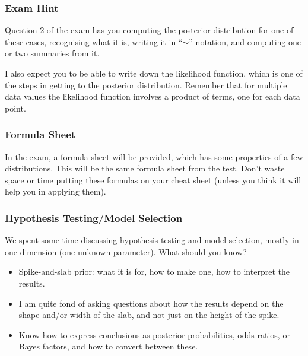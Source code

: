 \documentclass{beamer}
\begin{document}
\begin{frame}
\frametitle{Exam Hint}
Question 2 of the exam has you computing the posterior distribution for one
of these cases, recognising what it is, writing it in ``$\sim$'' notation,
and computing one or two summaries from it.\\[0.5em]\pause

I also expect you to be able to write down the likelihood function, which
is one of the steps in getting to the posterior distribution. Remember that
for multiple data values the likelihood function involves a product of terms,
one for each data point.

\end{frame}


\begin{frame}
\frametitle{Formula Sheet}
In the exam, a formula sheet will be provided, which has some properties of
a few distributions. This will be the same formula sheet from the test.
Don't waste space or time putting these formulas on your cheat sheet (unless
you think it will help you in applying them).

\end{frame}


\begin{frame}
\frametitle{Hypothesis Testing/Model Selection}
We spent some time discussing hypothesis testing and model selection,
mostly in one dimension (one unknown parameter). What should you know?\pause

\begin{itemize}
\item Spike-and-slab prior: what it is for, how to make one, how to interpret
the results.\pause
\item I am quite fond of asking questions about how the results depend on the
shape and/or width of the slab, and not just on the height of the spike.\pause
\item Know how to express conclusions as posterior probabilities, odds ratios,
or Bayes factors, and how to convert between these.
\end{itemize}


\end{frame}
\end{document}
